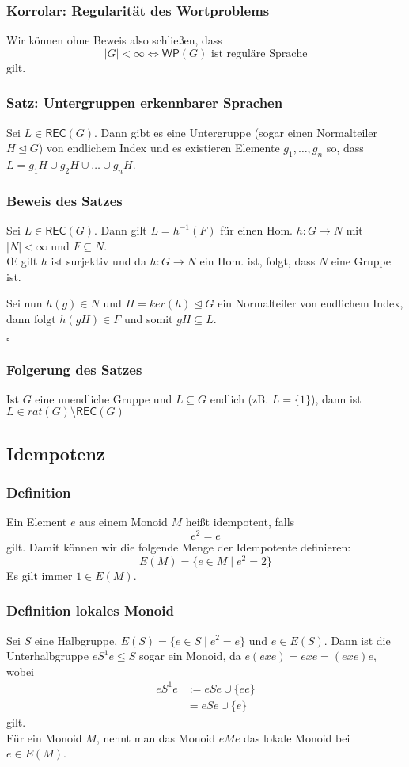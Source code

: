 \documentclass[12pt, german]{article}
\newcommand{\inv}{^{-1}}
\newcommand{\rec}{\mathsf{REC}}
\newcommand{\wop}{\mathsf{WP}}
\newcommand{\bewiesen}{
	
	\begin{flushright}
		$\square$  \\
\end{flushright}}
\begin{document}
	\subsubsection{Korrolar: Regularität des Wortproblems}
	Wir können ohne Beweis also schlie\ss en, dass $$|G| < \infty \iff \wop(G) \text{ ist reguläre Sprache}$$ gilt.
	
	\subsubsection{Satz: Untergruppen erkennbarer Sprachen}
	Sei $L \in \rec(G)$. Dann gibt es eine Untergruppe (sogar einen Normalteiler $H \trianglelefteq G$) von endlichem Index und es existieren Elemente
	$g_1, \ldots, g_n$ so, dass $L = g_1H \cup g_2H \cup \ldots \cup g_nH$.   
	
	\subsubsection{Beweis des Satzes}
	Sei $L \in \rec(G)$. Dann gilt $L= h\inv(F)$ für einen Hom. $h:G \to N$ mit $|N| < \infty$ und $F \subseteq N$. \\
	
	\OE $\, \,$gilt $h$ ist surjektiv und da $h:G \to N$ ein Hom. ist, folgt, dass $N$  eine Gruppe ist. 
	
	Sei nun $h(g) \in N$ und $H= ker(h) \trianglelefteq G$ ein Normalteiler von endlichem Index, dann folgt $h(gH) \in F$ und somit $gH \subseteq L$.
	\bewiesen
	
	\subsubsection{Folgerung des Satzes}	
	Ist $G$ eine unendliche Gruppe und $L \subseteq G$ endlich (zB. $L = \{1\}$), dann ist $L \in rat(G) \setminus \rec(G)$
	
	\subsection{Idempotenz}
	\subsubsection{Definition}
	Ein Element $e$ aus einem Monoid $M$ hei\ss t idempotent, falls $$e^2 = e$$gilt.
	Damit können wir die folgende Menge der Idempotente definieren: $$E(M) = \{ e \in M \mid e^2 = 2\}$$ Es gilt immer $1\in E(M)$.
	
	\subsubsection{Definition lokales Monoid}
	Sei $S$ eine Halbgruppe, $E(S) = \{e \in S \mid e^2 = e\}$ und $e \in E(S)$. Dann ist die Unterhalbgruppe $eS^1e \leq S$ sogar ein Monoid, da 	$e(exe) = exe = (exe)e$, wobei 
	\begin{align*}
		eS^1e &:= eSe \cup \{ee\} \\
		&=eSe \cup \{e\}
	\end{align*}
	gilt.\\
	Für ein Monoid $M$, nennt man das Monoid $eMe$ das lokale Monoid bei $e \in E(M)$.
	
\end{document}
